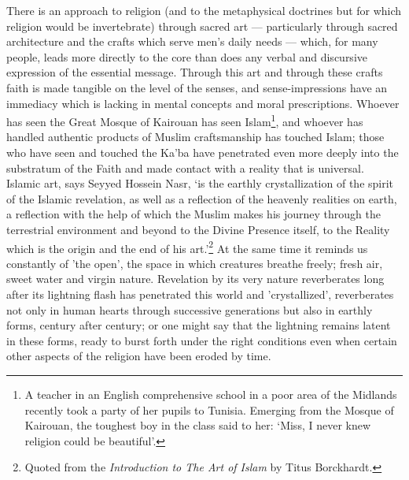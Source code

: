 \documentclass[10pt, twoside]{book}
\begin{document}
There is an approach to religion (and to the metaphysical doctrines but for which religion would be 
invertebrate) through sacred art --- particularly through sacred architecture and the crafts which 
serve men's daily needs --- which, for many people, leads more directly to the core than does any 
verbal and discursive expression of the essential message. Through this art and through these crafts 
faith is made tangible on the level of the senses, and sense-impressions have an immediacy which is 
lacking in mental concepts and moral prescriptions. Whoever has seen the Great Mosque of Kairouan has 
seen Islam\footnote{A teacher in an English comprehensive school in a poor area of the Midlands recently took a party 
of her pupils to Tunisia. Emerging from the Mosque of Kairouan, the toughest boy in the class said to 
her: `Miss, I never knew religion could be beautiful'.}, and whoever has handled authentic products of Muslim craftsmanship has touched Islam; 
those who have seen and touched the Ka'ba have penetrated even more deeply into the substratum of the 
Faith and made contact with a reality that is universal. \\

Islamic art, says Seyyed Hossein Nasr, `is the earthly crystallization of the spirit of the Islamic 
revelation, as well as a reflection of the heavenly realities on earth, a reflection with the help of 
which the Muslim makes his journey through the terrestrial environment and beyond to the Divine 
Presence itself, to the Reality which is the origin and the end of his art.'\footnote{Quoted from the \emph{Introduction to The Art of Islam} by Titus Borckhardt.} At the same time it 
reminds us constantly of 'the open', the space in which creatures breathe freely; fresh air, sweet 
water and virgin nature. Revelation by its very nature reverberates long after its lightning flash 
has penetrated this world and 'crystallized', reverberates not only in human hearts through 
successive generations but also in earthly forms, century after century; or one might say that the 
lightning remains latent in these forms, ready to burst forth under the right conditions even when 
certain other aspects of the religion have been eroded by time. \\
\end{document}
